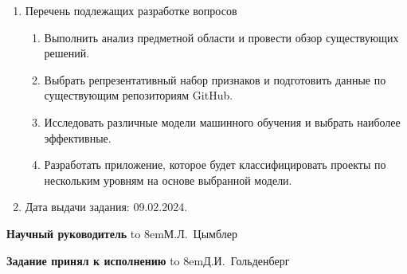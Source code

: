 \begin{adjustwidth}{-1.5cm}{0.5cm}
\begin{linespread}{1}
{\begin{enumerate}
	\bf\item Перечень подлежащих разработке вопросов\rm
	\begin{enumerate}
		
    \item Выполнить анализ предметной области и провести обзор существующих решений.

    \item Выбрать репрезентативный набор признаков и подготовить данные по существующим репозиториям GitHub.

   \item Исследовать различные модели машинного обучения и выбрать наиболее эффективные.

    \item Разработать приложение, которое будет классифицировать проекты по нескольким уровням на основе выбранной модели.
	\end{enumerate}

	\bf\item Дата выдачи задания: \rm
	09.02.2024.
\end{enumerate}

\vspace{1em}

\noindent
\textbf{Научный руководитель}
\hfill
\hbox to 8em{М.Л.~Цымблер\hfill}

\vspace{1em}

\noindent
\textbf{Задание принял к исполнению}
\hfill
\hbox to 8em{Д.И.~Гольденберг\hfill}

}

\thispagestyle{empty}

\end{linespread}
\end{adjustwidth}

\pagebreak

